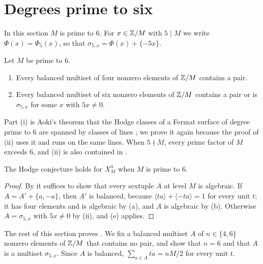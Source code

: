 \section{Degrees prime to six}\label{sec:primetosix}

In this section $M$ is prime to $6$. For $x\in\mathbb{Z}/M$ with $5\mid M$ we write
$\Phi(x)=\Phi_{5}(x)$, so that $\sigma_{5,x}=\Phi(x)+\{-5x\}$.

\begin{theorem}\label{thm:sextuples}
Let $M$ be prime to $6$.
\begin{enumerate}[label=\textup{(\roman*)}]
\item Every balanced multiset of four nonzero elements of $\mathbb{Z}/M$ contains a
pair.
\item Every balanced multiset of six nonzero elements of $\mathbb{Z}/M$ contains a
pair or is $\sigma_{5,x}$ for some $x$ with $5x\ne0$.
\end{enumerate}
\end{theorem}

Part (i) is Aoki's theorem that the Hodge classes of a Fermat surface of
degree prime to $6$ are spanned by classes of lines \cite[Theorem~A]{Aok83};
we prove it again because the proof of (ii) uses it and runs on the same
lines. When $5\nmid M$, every prime factor of $M$ exceeds $6$, and (ii) is
also contained in \cite[Theorem~A]{Aok83}.

\begin{corollary}\label{cor:primetosix}
The Hodge conjecture holds for $X^{4}_{M}$ when $M$ is prime to $6$.
\end{corollary}

\begin{proof}
By  it suffices to show that every sextuple $A$ at
level $M$ is algebraic. If $A=A'+\{a,-a\}$, then $A'$ is balanced, because
$\langle ta\rangle+\langle-ta\rangle=1$ for every unit $t$; it has four
elements and is algebraic by (a), and $A$ is algebraic by
(b). Otherwise $A=\sigma_{5,x}$ with $5x\ne0$ by
(ii), and (e) applies.
\end{proof}

The rest of this section proves . We fix a balanced
multiset $A$ of $n\in\{4,6\}$ nonzero elements of $\mathbb{Z}/M$ that contains no
pair, and show that $n=6$ and that $A$ is a multiset $\sigma_{5,x}$. Since $A$
is balanced, $\sum_{a\in A}\overline{ta}=nM/2$ for every unit $t$.

